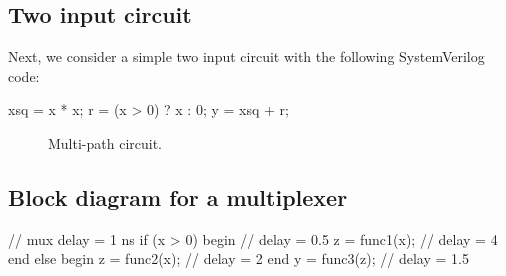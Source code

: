 \documentclass[11pt]{article}
\begin{document}
\subsection{Two input circuit}
Next, we consider a simple two input circuit with the following SystemVerilog code:
\begin{systemverilogcode}
xsq = x * x;
r = (x > 0) ? x : 0;
y = xsq + r;
\end{systemverilogcode}

  
\begin{figure}
\centering

  \caption{Multi-path circuit.}
  \label{fig:multi_path}
\end{figure}

\subsection{Block diagram for a multiplexer}
\begin{systemverilogcode}
// mux delay = 1 ns
if (x > 0) begin  // delay = 0.5
  z = func1(x);  // delay = 4
end else begin 
  z = func2(x);  // delay = 2
end
y = func3(z);    // delay = 1.5
\end{systemverilogcode}
\end{document}
